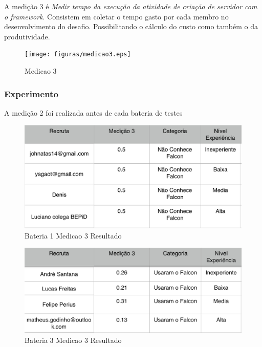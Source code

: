 A medição 3 é \textit{Medir tempo da execução da atividade de criação de servidor com o framework}. Consistem em
coletar o tempo gasto por cada membro no desenvolvimento do desafio. Possibilitando o cálculo do custo como também
o da produtividade.

\begin{figure}[H]
  \centering
  \label{fig:indicadores}
  \texttt{[image: figuras/medicao3.eps]}
  \caption{Medicao 3}
\end{figure}

\subsubsection{Experimento}

A medição 2 foi realizada antes de cada bateria de testes


\begin{figure}[H]
  \centering
  \label{fig:indicadores}
  \includegraphics[keepaspectratio=true,scale=0.6]{figuras/Bateria1Medicao3.eps}
  \caption{Bateria 1 Medicao 3 Resultado}
\end{figure}


\begin{figure}[H]
  \centering
  \label{fig:indicadores}
  \includegraphics[keepaspectratio=true,scale=0.6]{figuras/Bateria3Medicao3.eps}
  \caption{Bateria 3 Medicao 3 Resultado}
\end{figure}



